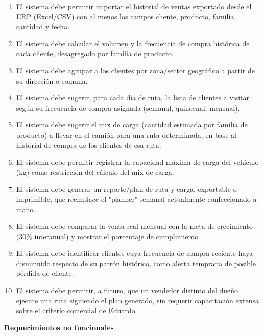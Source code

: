 \documentclass[10pt,a4paper]{article}
\begin{document}
\begin{enumerate}[leftmargin=1.5cm, itemsep=0.4em]
    \item El sistema debe permitir importar el historial de ventas exportado desde el ERP (Excel/CSV) con al menos los campos cliente, producto, familia, cantidad y fecha. 
    \item El sistema debe calcular el volumen y la frecuencia de compra histórica de cada cliente, desagregado por familia de producto. 
    \item El sistema debe agrupar a los clientes por zona/sector geográfico a partir de su dirección o comuna.
    \item El sistema debe sugerir, para cada día de ruta, la lista de clientes a visitar según su frecuencia de compra asignada (semanal, quincenal, mensual). 
    \item El sistema debe sugerir el mix de carga (cantidad estimada por familia de producto) a llevar en el camión para una ruta determinada, en base al historial de compra de los clientes de esa ruta.
    \item El sistema debe permitir registrar la capacidad máxima de carga del vehículo (kg) como restricción del cálculo del mix de carga. 
    \item El sistema debe generar un reporte/plan de ruta y carga, exportable o imprimible, que reemplace el "planner" semanal actualmente confeccionado a mano.
    \item El sistema debe comparar la venta real mensual con la meta de crecimiento (30\% interanual) y mostrar el porcentaje de cumplimiento
    \item El sistema debe identificar clientes cuya frecuencia de compra reciente haya disminuido respecto de su patrón histórico, como alerta temprana de posible pérdida de cliente. 
    \item El sistema debe permitir, a futuro, que un vendedor distinto del dueño ejecute una ruta siguiendo el plan generado, sin requerir capacitación extensa sobre el criterio comercial de Eduardo. 
    
\end{enumerate}

\textbf{Requerimientos no funcionales}
\end{document}
